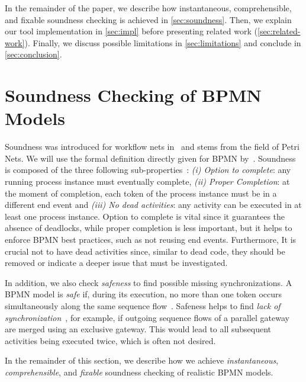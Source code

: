 \documentclass[runningheads]{llncs}
\begin{document}
In the remainder of the paper, we describe how instantaneous, comprehensible, and fixable soundness checking is achieved in \autoref{sec:soundness}.
Then, we explain our tool implementation in \autoref{sec:impl} before presenting related work (\autoref{sec:related-work}).
Finally, we discuss possible limitations in \autoref{sec:limitations} and conclude in \autoref{sec:conclusion}.

\section{Soundness Checking of BPMN Models} \label{sec:soundness}

Soundness was introduced for workflow nets in~\cite{vanderaalstApplicationPetriNets1998} and stems from the field of Petri Nets.
We will use the formal definition directly given for BPMN by~\cite{corradiniClassificationBPMNCollaborations2018}.
Soundness is composed of the three following sub-properties~\cite{corradiniClassificationBPMNCollaborations2018}:
\textit{(i) Option to complete}: any running process instance must eventually complete,
\textit{(ii) Proper Completion}: at the moment of completion, each token of the process instance must be in a different end event and
\textit{(iii) No dead activities}: any activity can be executed in at least one process instance.
Option to complete is vital since it guarantees the absence of deadlocks, while proper completion is less important, but it helps to enforce BPMN best practices, such as not reusing end events.
Furthermore, It is crucial not to have dead activities since, similar to dead code, they should be removed or indicate a deeper issue that must be investigated.

In addition, we also check \textit{safeness} to find possible missing synchronizations.
A BPMN model is \textit{safe} if, during its execution, no more than one token occurs simultaneously along the same sequence flow~\cite{corradiniClassificationBPMNCollaborations2018}.
Safeness helps to find \textit{lack of synchronization}~\cite{fahlandAnalysisDemandInstantaneous2011}, for example, if outgoing sequence flows of a parallel gateway are merged using an exclusive gateway.
This would lead to all subsequent activities being executed twice, which is often not desired.

In the remainder of this section, we describe how we achieve \textit{instantaneous}, \textit{comprehensible}, and \textit{fixable} soundness checking of realistic BPMN models.
\end{document}
